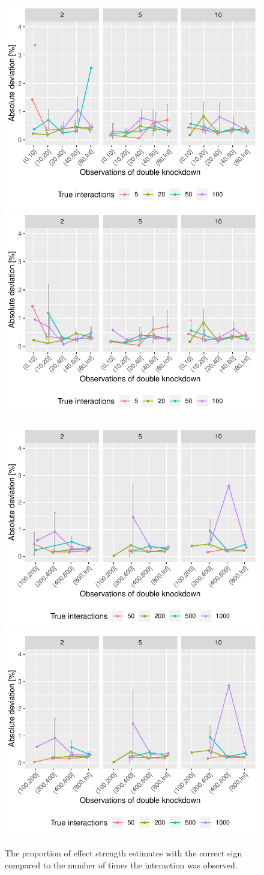 

\begin{figure}
	\begin{minipage}{\linewidth}
	\centering
	\includegraphics[width=0.5\linewidth]{"output/FXdiff_n1000_tno"}%
	\includegraphics[width=0.5\linewidth]{"output/FXdiff_n1000_tyes"}
\end{minipage}
\begin{minipage}{\linewidth}
	\centering
	\includegraphics[width=0.5\linewidth]{"output/FXdiff_n10000_tno"}%
	\includegraphics[width=0.5\linewidth]{"output/FXdiff_n10000_tyes"}
\end{minipage}
\caption{The proportion of effect strength estimates with the correct sign compared to the number of times the interaction was observed.}
\end{figure}







